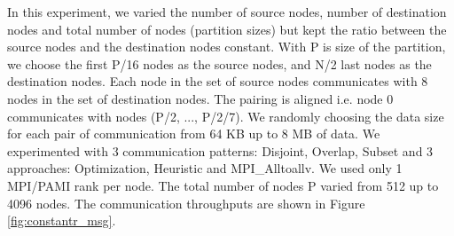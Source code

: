 In this experiment, we varied the number of source nodes, number of destination nodes and total number of nodes (partition sizes) but kept the ratio between the source nodes and the destination nodes constant. With P is size of the partition, we choose the first P/16 nodes as the source nodes, and N/2 last nodes as the destination nodes. Each node in the set of source nodes communicates with 8 nodes in the set of destination nodes. The pairing is aligned i.e. node 0 communicates with nodes (P/2, ..., P/2/7). We randomly choosing the data size for each pair of communication from 64 KB up to 8 MB of data. We experimented with 3 communication patterns: Disjoint, Overlap, Subset and 3 approaches: Optimization, Heuristic and MPI\_Alltoallv. We used only 1 MPI/PAMI rank per node. The total number of nodes P varied from 512 up to 4096 nodes. The communication throughputs are shown in Figure \ref{fig:constantr_msg}.

